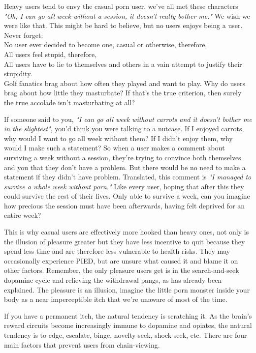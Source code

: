 \documentclass[easypeasy]{subfiles}
\begin{document}
Heavy users tend to envy the casual porn user, we've all met these characters \textit{"Oh, I can go all week without a session, it doesn't really bother me."} We wish we were like that. This might be hard to believe, but no users enjoys being a user. Never forget:\\

      No user ever decided to become one, casual or otherwise, therefore, \\
      All users feel stupid, therefore, \\
      All users have to lie to themselves and others in a vain attempt to justify their stupidity. \\

Golf fanatics brag about how often they played and want to play. Why do users brag about how little they masturbate? If that's the true criterion, then surely the true accolade isn't masturbating at all?

If someone said to you, \textit{"I can go all week without carrots and it doesn't bother me in the slightest"}, you'd think you were talking to a nutcase. If I enjoyed carrots, why would I want to go all week without them? If I didn't enjoy them, why would I make such a statement? So when a user makes a comment about surviving a week without a session, they're trying to convince both themselves and you that they don't have a problem. But there would be no need to make a statement if they didn't have problem. Translated, this comment is \textit{"I managed to survive a whole week without porn."} Like every user, hoping that after this they could survive the rest of their lives. Only able to survive a week, can you imagine how precious the session must have been afterwards, having felt deprived for an entire week?

This is why casual users are effectively more hooked than heavy ones, not only is the illusion of pleasure greater but they have less incentive to quit because they spend less time and are therefore less vulnerable to health risks. They may occasionally experience PIED, but are unsure what caused it and blame it on other factors. Remember, the only pleasure users get is in the search-and-seek dopamine cycle and relieving the withdrawal pangs, as has already been explained. The pleasure is an illusion, imagine the little porn monster inside your body as a near imperceptible itch that we're unaware of most of the time.

If you have a permanent itch, the natural tendency is scratching it. As the brain's reward circuits become increasingly immune to dopamine and opiates, the natural tendency is to edge, escalate, binge, novelty-seek, shock-seek, etc. There are four main factors that prevent users from chain-viewing.
\end{document}
